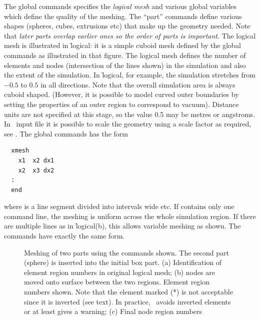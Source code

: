 \documentclass[a4paper,twoside,11pt]{book}
\begin{document}
The global commands specifies the \emph{logical mesh} and various
global variables which define the quality of the meshing. The ``part''
commands define various shapes (spheres, cubes, extrusions etc) that
make up the geometry needed. Note that \emph{later parts overlap
  earlier ones so the order of parts is important}. The logical mesh
is illustrated in \f{logical}: it is a simple cuboid mesh defined by
the global commands  as illustrated in that
figure. The logical mesh defines the number of elements and nodes
(intersection of the lines shown) in the simulation and also the
extent of the simulation. In \f{logical}, for example, the simulation
stretches from $-0.5$ to $0.5$ in all directions. Note that the
overall simulation area is always cuboid shaped. (However, it is
possible to model curved outer boundaries by setting the properties of
an outer region to correspond to vacuum). Distance
units are not specified at this stage, so the value 0.5 may be metres
or angstroms. In \zinc\ input file  it is possible to
scale the geometry using a scale factor as required, see . The
global commands  has the form
\begin{verbatim}
  xmesh
    x1  x2 dx1
    x2  x3 dx2
  :
  end
\end{verbatim}
where \var{[x1,x2]} is a line segment divided into intervals 
wide etc. If  contains only one command line, the meshing
is uniform across the whole simulation region. If there are multiple
lines as in \f{logical}(b), this allows variable meshing as shown. The commands
 have exactly the same form.

\begin{figure}
  \caption{Meshing of two parts using the commands shown. The second
    part (sphere) is inserted into the initial box part. (a)
    Identification of element region numbers in original logical mesh;
    (b) nodes are moved onto surface between the two regions. Element
    region numbers shown. Note that the element marked (*) is not
    acceptable since it is inverted (see text). In practice, \zmesh\
    avoids inverted elements or at least gives a warning; (c) Final
    node region numbers}
  \label{meshing}
\end{figure}
\end{document}
